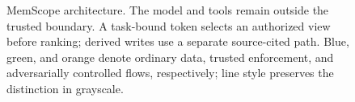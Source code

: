 \begin{figure}[t]
{
}
\caption{MemScope architecture. The model and tools remain outside the trusted boundary. A task-bound token selects an authorized view before ranking; derived writes use a separate source-cited path. Blue, green, and orange denote ordinary data, trusted enforcement, and adversarially controlled flows, respectively; line style preserves the distinction in grayscale.}
\label{fig:architecture}
\end{figure}

